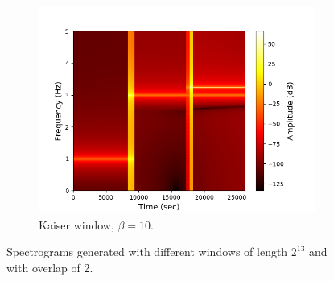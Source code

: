 \begin{figure}[H]
\begin{subfigure}{0.49\textwidth}
\includegraphics[width=\textwidth]{figures/stft_windows/kaiser/10000/10.png}
\caption{Kaiser window, $\beta=10$.}
\label{fig:stft_kaiser_10000_10}
\end{subfigure}
\caption{Spectrograms generated with different windows of length $2^{13}$ and with overlap of 2.}
\label{fig:stft_windows_10000}
\end{figure}
